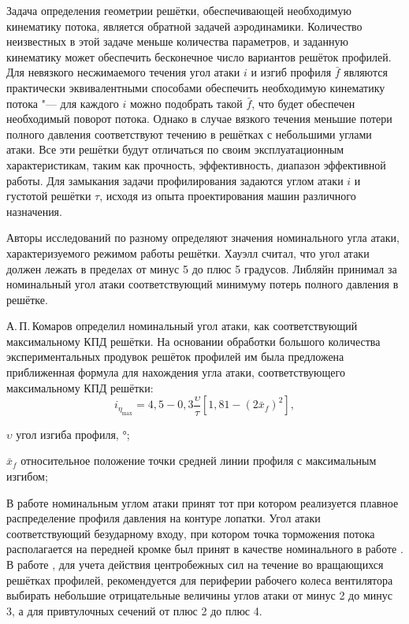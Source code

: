 Задача определения геометрии решётки, обеспечивающей необходимую кинематику потока, является обратной задачей аэродинамики. Количество неизвестных в этой задаче меньше количества параметров, и заданную кинематику может обеспечить бесконечное число вариантов решёток профилей. Для невязкого несжимаемого течения угол атаки \(i\) и изгиб профиля \(\bar{f}\) являются практически эквивалентными способами обеспечить необходимую кинематику потока "--- для каждого \(i\) можно подобрать такой \(\bar{f}\), что будет обеспечен необходимый поворот потока. Однако в случае вязкого течения меньшие потери полного давления соответствуют течению в решётках с небольшими углами атаки. Все эти решётки будут отличаться по своим эксплуатационным характеристикам, таким как прочность, эффективность, диапазон эффективной работы. Для замыкания задачи профилирования задаются углом атаки \(i\) и густотой решётки \(\tau\), исходя из опыта проектирования машин различного назначения.

Авторы исследований по разному определяют значения номинального угла атаки, характеризуемого режимом работы решётки. Хауэлл \cite{Howell1945} считал, что угол атаки должен лежать в пределах от минус 5 до плюс 5 градусов. Либляйн \cite{Lieblein1959} принимал за номинальный угол атаки соответствующий минимуму потерь полного давления в решётке. 

А.\,П.\,Комаров \cite{Komarov1967} определил номинальный угол атаки, как соответствующий максимальному КПД решётки. На основании обработки большого количества экспериментальных продувок решёток профилей им была предложена приближенная формула для нахождения угла атаки, соответствующего максимальному КПД решётки:
\begin{equation}
	i_{\eta_\text{max}}=4,5-0,3\frac{\upsilon}{\tau} \left[ 1,81- \left(2\bar{x}_{f}\right)^2 \right],
\end{equation}
\begin{eqexpl}
	\item{\(\upsilon\)} угол изгиба профиля, \(\si\degree\);
	\item{\(\bar{x}_f\)} относительное положение точки средней линии профиля с максимальным изгибом;
\end{eqexpl}

В работе \cite{Emery1951} номинальным углом атаки принят тот при котором реализуется плавное распределение профиля давления на контуре лопатки. Угол атаки соответствующий безударному входу, при котором точка торможения потока располагается на передней кромке был принят в качестве номинального в работе \cite{Judin1947}. В работе \cite{Brusilovskiy1986}, для учета действия центробежных сил на течение во вращающихся решётках профилей, рекомендуется для периферии рабочего колеса вентилятора выбирать  небольшие отрицательные величины углов атаки от минус 2 до минус 3, а для привтулочных сечений от плюс 2 до плюс 4.

